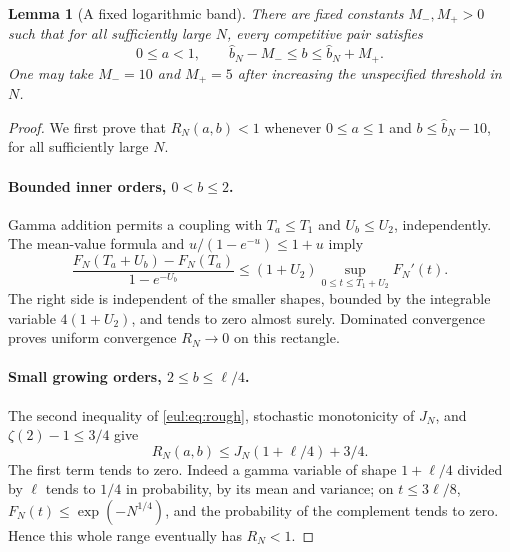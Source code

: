 \documentclass[11pt]{article}
\numberwithin{equation}{section}
\newtheorem{lemma}[theorem]{Lemma}
\theoremstyle{definition}
\theoremstyle{remark}
\begin{document}
\begin{lemma}[A fixed logarithmic band]\label{eul:lem:band}
There are fixed constants $M_-,M_+>0$ such that for all sufficiently
large $N$, every competitive pair satisfies
\[
 0\leq a<1,\qquad
 \widehat b_N-M_-\leq b\leq\widehat b_N+M_+.
\]
One may take $M_-=10$ and $M_+=5$ after increasing the unspecified
threshold in $N$.
\end{lemma}
\begin{proof}
We first prove that $R_N(a,b)<1$ whenever $0\leq a\leq1$ and
$b\leq\widehat b_N-10$, for all sufficiently large $N$.

\paragraph{Bounded inner orders, $0<b\leq2$.}
Gamma addition permits a coupling with $T_a\leq T_1$ and
$U_b\leq U_2$, independently.  The mean-value formula and
$u/(1-e^{-u})\leq1+u$ imply
\[
 \frac{F_N(T_a+U_b)-F_N(T_a)}{1-e^{-U_b}}
 \leq(1+U_2)\sup_{0\leq t\leq T_1+U_2}F_N'(t).
\]
The right side is independent of the smaller shapes, bounded by the
integrable variable $4(1+U_2)$, and tends to zero almost surely.
Dominated convergence proves uniform convergence $R_N\to0$ on this
rectangle.

\paragraph{Small growing orders, $2\leq b\leq\ell/4$.}
The second inequality of \eqref{eul:eq:rough}, stochastic monotonicity of
$J_N$, and $\zeta(2)-1\leq3/4$ give
\[
 R_N(a,b)\leq J_N(1+\ell/4)+3/4.
\]
The first term tends to zero.  Indeed a gamma variable of shape
$1+\ell/4$ divided by $\ell$ tends to $1/4$ in probability, by its
mean and variance; on $t\leq3\ell/8$,
$F_N(t)\leq\exp(-N^{1/4})$, and the probability of the complement
tends to zero.  Hence this whole range eventually has $R_N<1$.


\end{proof}
\end{document}
